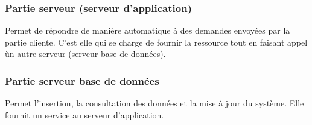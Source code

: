 \subsubsection{Partie serveur (serveur d'application)}
Permet de r\'epondre de mani\`ere automatique \`a des demandes envoy\'ees par la partie cliente. C'est elle qui se charge de fournir la ressource tout en faisant appel \` un autre serveur (serveur base de donn\'ees).

\subsubsection{Partie serveur base de donn\'ees}
Permet l'insertion, la consultation des donn\'ees et la mise \`a jour du syst\`eme. Elle fournit un service au serveur d'application.

